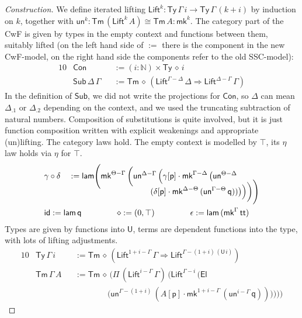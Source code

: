\documentclass[sigplan,10pt,anonymous,review]{acmart}\settopmatter{printfolios=true,printccs=false,printacmref=false}
\newcommand{\ra}{\rightarrow}
\newcommand{\Ra}{\Rightarrow}
\newcommand{\Ty}{\mathsf{Ty}}
\newcommand{\Tm}{\mathsf{Tm}}
\newcommand{\Con}{\mathsf{Con}}
\newcommand{\Sub}{\mathsf{Sub}}
\newcommand{\p}{\mathsf{p}}
\newcommand{\q}{\mathsf{q}}
\newcommand{\N}{\mathbb{N}}
\newcommand{\lam}{\mathsf{lam}}
\newcommand{\U}{\mathsf{U}}
\newcommand{\El}{\mathsf{El}}
\renewcommand{\tt}{\mathsf{tt}}
\newcommand{\Lift}{\mathsf{Lift}}
\newcommand{\mk}{\mathsf{mk}}
\newcommand{\un}{\mathsf{un}}
\newcommand{\id}{\mathsf{id}}
\begin{document}
\begin{proof}[Construction]
  We define iterated lifting $\Lift^k :
  \Ty\,\Gamma\,i\ra\Ty\,\Gamma\,(k+i)$ by induction on $k$, together
  with $\un^k : \Tm\,(\Lift^k\,A)\cong\Tm\,A : \mk^k$. The category
  part of the CwF is given by types in the empty context and functions
  between them, suitably lifted (on the left hand side of $:=$ there
  is the component in the new CwF-model, on the right hand side the
  components refer to the old SSC-model):
  \begin{alignat*}{10}
    & \Con && := (i:\N)\times\Ty\,\diamond\,i \\
    & \Sub\,\Delta\,\Gamma && := \Tm\,\diamond\,(\Lift^{\Gamma-\Delta}\,\Delta\Ra\Lift^{\Delta-\Gamma}\,\Gamma)
  \end{alignat*}
  In the definition of $\Sub$, we did not write the projections for
  $\Con$, so $\Delta$ can mean $\Delta_{.1}$ or $\Delta_{.2}$
  depending on the context, and we used the truncating subtraction of
  natural numbers. Composition of substitutions is quite involved, but
  it is just function composition written with explicit weakenings and
  appropriate (un)lifting. The category laws hold. The empty context is
  modelled by $\top$, its $\eta$ law holds via $\eta$ for $\top$.
  \begin{alignat*}{10}
    & \gamma\circ\delta && := \lam\Bigg(\mk^{\Theta-\Gamma}\,\bigg(\un^{\Delta-\Gamma}\,\Big(\gamma[\p]\cdot\mk^{\Gamma-\Delta}\,\big(\un^{\Theta-\Delta}\, \\[-1.5em]
    & && \hspace{10em}(\delta[\p]\cdot\mk^{\Delta-\Theta}\,(\un^{\Gamma-\Theta}\,\q))\big)\Big)\bigg)\Bigg) \\
    & \rlap{$\id := \lam\,\q \hspace{4.35em} \diamond := (0,\top) \hspace{4.35em} \epsilon := \lam\,(\mk^\Gamma\,\tt)$}
  \end{alignat*}
  Types are given by functions into $\U$, terms are dependent
  functions into the type, with lots of lifting adjustments.
  \begin{alignat*}{10}
    & \Ty\,\Gamma\,i && := \Tm\,\diamond\,(\Lift^{1+i-\Gamma}\,\Gamma\Ra\Lift^{\Gamma-(1+i)\,(\U\,i)}) \\
    & \Tm\,\Gamma\,A && := \Tm\,\diamond\,\Bigg(\Pi\,(\Lift^{i-\Gamma}\,\Gamma)\,\bigg(\Lift^{\Gamma-i}\,\Big(\El\, \\[-1em]
    & && \hspace{4em} \big(\un^{\Gamma-(1+i)}\,(A[\p]\cdot\mk^{1+i-\Gamma}\,(\un^{i-\Gamma}\,\q))\big)\Big)\bigg)\Bigg)

\end{alignat*}
\end{proof}
\end{document}
